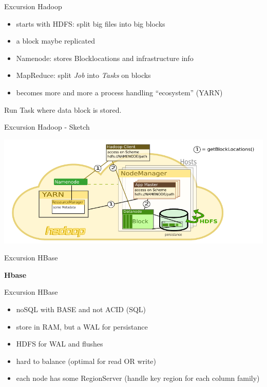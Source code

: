 \begin{frame}{Excursion Hadoop}
\protect\hypertarget{excursion-hadoop-1}{}

\begin{itemize}
\tightlist
\item
  starts with HDFS: split big files into big blocks
\item
  a block maybe replicated
\item
  Namenode: stores Blocklocations and infrastructure info
\item
  MapReduce: split \emph{Job} into \emph{Tasks} on blocks
\item
  becomes more and more a process handling ``ecosystem'' (YARN)
\end{itemize}

Run Task where data block is stored.

\end{frame}

\begin{frame}{Excursion Hadoop - Sketch}
\protect\hypertarget{excursion-hadoop---sketch}{}

\includegraphics{fig/hadoop.pdf}

\end{frame}

\begin{frame}{Excursion HBase}
\protect\hypertarget{excursion-hbase}{}

\textbf{Hbase}

\end{frame}

\begin{frame}{Excursion HBase}
\protect\hypertarget{excursion-hbase-1}{}

\begin{itemize}
\tightlist
\item
  noSQL with BASE and not ACID (SQL)
\item
  store in RAM, but a WAL for persistance
\item
  HDFS for WAL and flushes
\item
  hard to balance (optimal for read OR write)
\item
  each node has some RegionServer (handle key region for each column
  family)
\end{itemize}

\end{frame}

